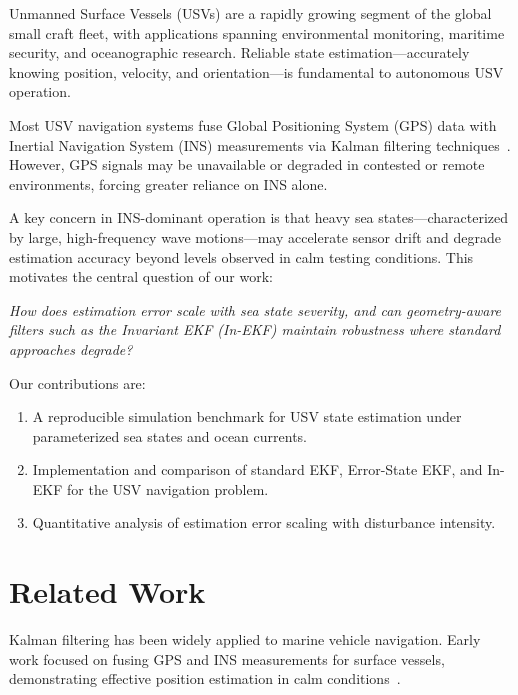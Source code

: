 \documentclass[conference]{IEEEtran}
\begin{document}
Unmanned Surface Vessels (USVs) are a rapidly growing segment of the global small craft fleet, with applications spanning environmental monitoring, maritime security, and oceanographic research. Reliable state estimation---accurately knowing position, velocity, and orientation---is fundamental to autonomous USV operation.

Most USV navigation systems fuse Global Positioning System (GPS) data with Inertial Navigation System (INS) measurements via Kalman filtering techniques~\cite{hawaii_usv}. However, GPS signals may be unavailable or degraded in contested or remote environments, forcing greater reliance on INS alone.

A key concern in INS-dominant operation is that heavy sea states---characterized by large, high-frequency wave motions---may accelerate sensor drift and degrade estimation accuracy beyond levels observed in calm testing conditions. This motivates the central question of our work:

\emph{How does estimation error scale with sea state severity, and can geometry-aware filters such as the Invariant EKF (In-EKF) maintain robustness where standard approaches degrade?}

Our contributions are:
\begin{enumerate}
  \item A reproducible simulation benchmark for USV state estimation under parameterized sea states and ocean currents.
  \item Implementation and comparison of standard EKF, Error-State EKF, and In-EKF for the USV navigation problem.
  \item Quantitative analysis of estimation error scaling with disturbance intensity.
\end{enumerate}

\section{Related Work}
\label{sec:related}


Kalman filtering has been widely applied to marine vehicle navigation. Early work focused on fusing GPS and INS measurements for surface vessels, demonstrating effective position estimation in calm conditions~\cite{hawaii_usv}.
\end{document}
